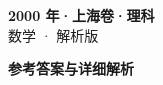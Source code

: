 \documentclass[zihao=-4, a4paper]{ctexart}
\begin{document}
\begin{center}
  {\Large\bfseries 2000 年·上海卷·理科}\\[4pt]
  {\large 数学 · 解析版}
\end{center}
\medskip
{}

\clearpage
{}
\begin{center}{\Large\bfseries 参考答案与详细解析}\end{center}
\medskip

\end{document}
